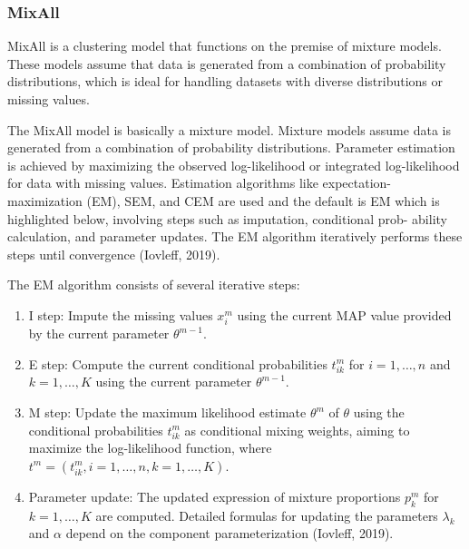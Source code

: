 \documentclass[11pt, a4paper]{article}
\begin{document}
\subsubsection{MixAll}

MixAll is a clustering model that functions on the premise of mixture models. These models assume that data is generated from a combination of probability distributions, which is ideal for handling datasets with diverse distributions or missing values.
\par
The MixAll model is basically a mixture model. Mixture models assume data is generated from a combination of probability distributions. Parameter estimation is achieved by maximizing the observed log-likelihood or integrated log-likelihood for data with missing values. Estimation algorithms like expectation-maximization (EM), SEM, and CEM are used and the default is EM which is highlighted below, involving steps such as imputation, conditional prob- ability calculation, and parameter updates. The EM algorithm iteratively performs these steps until convergence (Iovleff, 2019).
\par
The EM algorithm consists of several iterative steps:

\begin{enumerate}
\item I step: Impute the missing values $x^{m}_{i}$ using the current MAP value provided by the current parameter $\theta^{m-1}$.
\item E step: Compute the current conditional probabilities $t^{m}_{ik}$ for $i = 1, \ldots, n$ and $k = 1, \ldots, K$ using the current parameter $\theta^{m-1}$.
\item M step: Update the maximum likelihood estimate $\theta^{m}$ of $\theta$ using the conditional probabilities $t^{m}_{ik}$ as conditional mixing weights, aiming to maximize the log-likelihood function, where $t^{m} = (t^{m}_{ik}, i = 1, \ldots, n, k = 1, \ldots, K)$.
\item Parameter update: The updated expression of mixture proportions $p^{m}_{k}$ for $k = 1, \ldots, K$ are computed. Detailed formulas for updating the parameters $\lambda_{k}$ and $\alpha$ depend on the component parameterization (Iovleff, 2019).
\end{enumerate}
\end{document}
